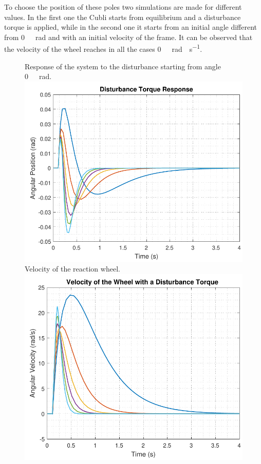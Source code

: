 To choose the position of these poles two simulations are made for different values. In the first one the Cubli starts from equilibrium and a disturbance torque is applied, while in the second one it starts from an initial angle different from \si{0\ rad} and with an initial velocity of the frame.  It can be observed that the velocity of the wheel reaches in all the cases \si{0\ rad \cdot s^{-1}}.
\begin{figure}[H]
	\begin{minipage}{\linewidth}
		\captionsetup[subfigure]{font = footnotesize}
		\centering
		\subcaptionbox
		{
			Response of the system to the disturbance starting from angle \si{0\ rad}.
			\label{disturbanceStateSpace}
		}
		{
			\includegraphics[scale=.55]{figures/disturbanceStateSpace}
		}\quad
		\subcaptionbox
		{
			Velocity of the reaction wheel.
			\label{disturbanceStateSpaceWheel}
		}
		{
			\includegraphics[scale=.55]{figures/disturbanceStateSpaceWheel}
}
\end{minipage}
\end{figure}
